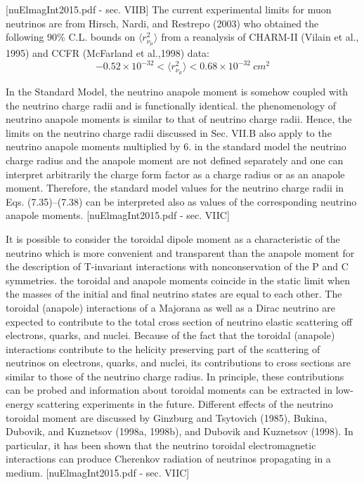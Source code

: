 [nuElmagInt2015.pdf - sec. VIIB]
The current experimental limits for muon neutrinos are from   Hirsch, Nardi, and Restrepo (2003) who obtained the
following 90\% C.L. bounds on $\langle r_{\nu_\mu}^2\rangle$ from a reanalysis of
CHARM-II (Vilain et al., 1995) and CCFR (McFarland et al.,1998) data:
\begin{equation}
-0.52\times 10^{-32}<\langle r_{\nu_\mu}^2\rangle<0.68\times 10^{-32}\ \unit{cm^2}
\end{equation}

In the Standard Model, the neutrino anapole moment is somehow coupled with the neutrino charge radii and is functionally identical. the phenomenology of neutrino anapole moments is similar to that of neutrino charge radii. Hence, the limits on the neutrino charge radii discussed in Sec. VII.B also apply to the neutrino anapole moments multiplied by 6.  in the standard model the neutrino charge radius and the anapole moment are not defined separately and one can interpret arbitrarily the charge form factor as a charge radius or as an anapole moment. Therefore, the standard model values for the neutrino charge radii in Eqs. (7.35)–(7.38) can be interpreted also as values of the corresponding neutrino anapole moments. [nuElmagInt2015.pdf - sec. VIIC]

It is possible to consider  the toroidal dipole moment as a characteristic of the neutrino which is more convenient and transparent than the anapole moment for the description of T-invariant interactions with nonconservation of the P and C symmetries. the toroidal and anapole moments coincide in the static limit when the masses of the initial and final neutrino states are equal to each other. The toroidal (anapole) interactions of a Majorana as well as a Dirac neutrino are expected to contribute to the total cross section of neutrino elastic scattering off electrons, quarks, and nuclei. Because of the fact that the toroidal (anapole) interactions contribute to the helicity preserving part of the scattering of neutrinos on electrons, quarks, and nuclei, its contributions to cross sections are similar to those of the neutrino charge radius. In principle, these contributions can be probed and information about toroidal moments can be extracted in low-energy scattering experiments in the future. Different effects of the neutrino toroidal moment are discussed by Ginzburg and Tsytovich (1985), Bukina, Dubovik, and Kuznetsov (1998a, 1998b), and Dubovik and Kuznetsov (1998). In particular, it has been shown that the neutrino toroidal electromagnetic interactions can produce Cherenkov radiation of neutrinos propagating in a medium. [nuElmagInt2015.pdf - sec. VIIC]

